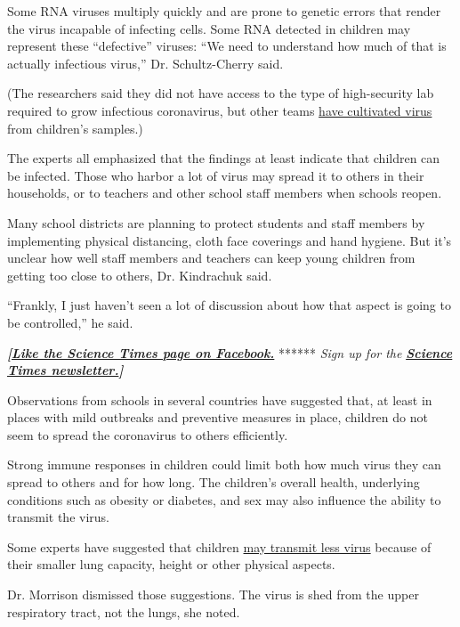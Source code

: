 Some RNA viruses multiply quickly and are prone to genetic errors that
render the virus incapable of infecting cells. Some RNA detected in
children may represent these ``defective'' viruses: ``We need to
understand how much of that is actually infectious virus,'' Dr.
Schultz-Cherry said.

(The researchers said they did not have access to the type of
high-security lab required to grow infectious coronavirus, but other
teams \href{https://pubmed.ncbi.nlm.nih.gov/32603290/}{have cultivated
virus} from children's samples.)

The experts all emphasized that the findings at least indicate that
children can be infected. Those who harbor a lot of virus may spread it
to others in their households, or to teachers and other school staff
members when schools reopen.

Many school districts are planning to protect students and staff members
by implementing physical distancing, cloth face coverings and hand
hygiene. But it's unclear how well staff members and teachers can keep
young children from getting too close to others, Dr. Kindrachuk said.

``Frankly, I just haven't seen a lot of discussion about how that aspect
is going to be controlled,'' he said.

\textbf{\emph{{[}}\href{http://on.fb.me/1paTQ1h}{\emph{Like the Science
Times page on Facebook.}}} ****** \emph{\textbar{} Sign up for the}
\textbf{\href{http://nyti.ms/1MbHaRU}{\emph{Science Times
newsletter.}}\emph{{]}}}

Observations from schools in several countries have suggested that, at
least in places with mild outbreaks and preventive measures in place,
children do not seem to spread the coronavirus to others efficiently.

Strong immune responses in children could limit both how much virus they
can spread to others and for how long. The children's overall health,
underlying conditions such as obesity or diabetes, and sex may also
influence the ability to transmit the virus.

Some experts have suggested that children
\href{https://www.nytimes.com/2020/06/30/us/coronavirus-schools-reopening-guidelines-aap.html}{may
transmit less virus} because of their smaller lung capacity, height or
other physical aspects.

Dr. Morrison dismissed those suggestions. The virus is shed from the
upper respiratory tract, not the lungs, she noted.

